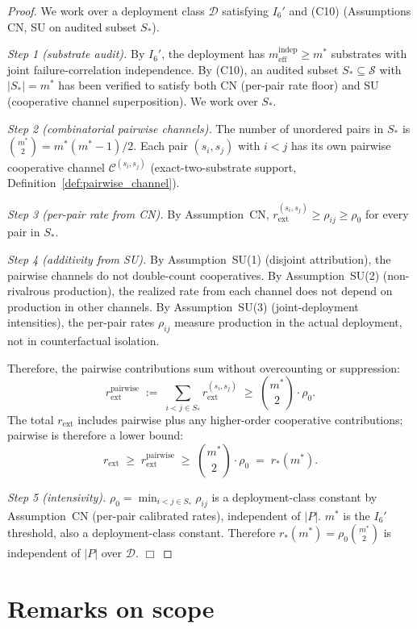 \documentclass{article}
\newcommand{\rext}{r_{\mathrm{ext}}}
\newcommand{\mindep}{m_{\mathrm{eff}}^{\mathrm{indep}}}
\newcommand{\Saudit}{S_*}
\begin{document}
\begin{proof}
We work over a deployment class $\mathcal{D}$ satisfying $I_6'$ and
(C10) (Assumptions CN, SU on audited subset $\Saudit$).

\emph{Step 1 (substrate audit).}  By $I_6'$, the deployment has
$\mindep \geq m^*$ substrates with joint failure-correlation
independence.  By (C10), an audited subset $\Saudit \subseteq
\mathcal{S}$ with $|\Saudit| = m^*$ has been verified to satisfy
both CN (per-pair rate floor) and SU (cooperative channel
superposition).  We work over $\Saudit$.

\emph{Step 2 (combinatorial pairwise channels).}  The number of
unordered pairs in $\Saudit$ is $\binom{m^*}{2} = m^*(m^*-1)/2$.
Each pair $(s_i, s_j)$ with $i < j$ has its own pairwise
cooperative channel $\mathcal{C}^{(s_i, s_j)}$ (exact-two-substrate
support, Definition~\ref{def:pairwise_channel}).

\emph{Step 3 (per-pair rate from CN).}  By Assumption~CN,
$\rext^{(s_i, s_j)} \geq \rho_{ij} \geq \rho_0$ for every pair in
$\Saudit$.

\emph{Step 4 (additivity from SU).}  By Assumption~SU(1) (disjoint
attribution), the pairwise channels do not double-count
cooperatives.  By Assumption~SU(2) (non-rivalrous production), the
realized rate from each channel does not depend on production in
other channels.  By Assumption~SU(3) (joint-deployment
intensities), the per-pair rates $\rho_{ij}$ measure production
in the actual deployment, not in counterfactual isolation.

Therefore, the pairwise contributions sum without overcounting or
suppression:
\[
  \rext^{\mathrm{pairwise}} \;:=\; \sum_{i<j \in \Saudit}
  \rext^{(s_i, s_j)} \;\geq\; \binom{m^*}{2} \cdot \rho_0.
\]
The total $\rext$ includes pairwise plus any higher-order
cooperative contributions; pairwise is therefore a lower bound:
\[
  \rext \;\geq\; \rext^{\mathrm{pairwise}} \;\geq\; \binom{m^*}{2}
  \cdot \rho_0 \;=\; r_*(m^*).
\]

\emph{Step 5 (intensivity).}  $\rho_0 = \min_{i<j \in \Saudit}
\rho_{ij}$ is a deployment-class constant by Assumption~CN
(per-pair calibrated rates), independent of $|P|$.  $m^*$ is the
$I_6'$ threshold, also a deployment-class constant.  Therefore
$r_*(m^*) = \rho_0 \binom{m^*}{2}$ is independent of $|P|$ over
$\mathcal{D}$.  $\Box$
\end{proof}

\section{Remarks on scope}
\end{document}
